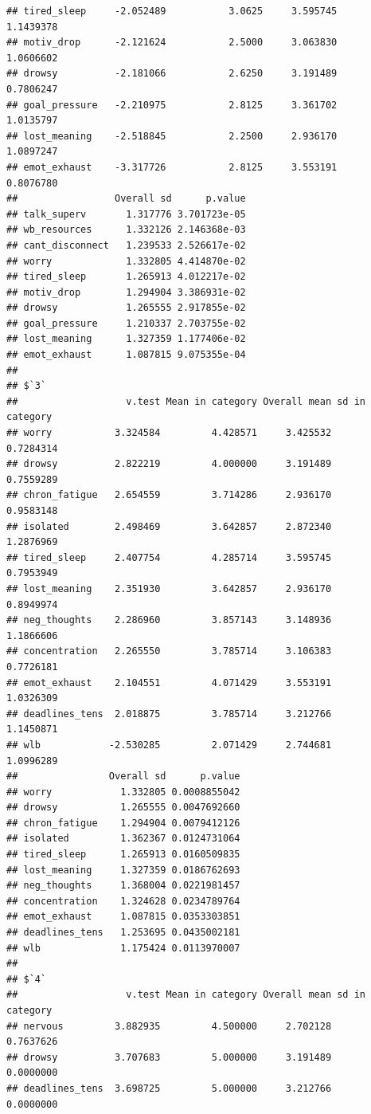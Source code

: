\documentclass[
]{article}
\begin{document}
\begin{verbatim}
## tired_sleep     -2.052489           3.0625     3.595745      1.1439378
## motiv_drop      -2.121624           2.5000     3.063830      1.0606602
## drowsy          -2.181066           2.6250     3.191489      0.7806247
## goal_pressure   -2.210975           2.8125     3.361702      1.0135797
## lost_meaning    -2.518845           2.2500     2.936170      1.0897247
## emot_exhaust    -3.317726           2.8125     3.553191      0.8076780
##                 Overall sd      p.value
## talk_superv       1.317776 3.701723e-05
## wb_resources      1.332126 2.146368e-03
## cant_disconnect   1.239533 2.526617e-02
## worry             1.332805 4.414870e-02
## tired_sleep       1.265913 4.012217e-02
## motiv_drop        1.294904 3.386931e-02
## drowsy            1.265555 2.917855e-02
## goal_pressure     1.210337 2.703755e-02
## lost_meaning      1.327359 1.177406e-02
## emot_exhaust      1.087815 9.075355e-04
## 
## $`3`
##                   v.test Mean in category Overall mean sd in category
## worry           3.324584         4.428571     3.425532      0.7284314
## drowsy          2.822219         4.000000     3.191489      0.7559289
## chron_fatigue   2.654559         3.714286     2.936170      0.9583148
## isolated        2.498469         3.642857     2.872340      1.2876969
## tired_sleep     2.407754         4.285714     3.595745      0.7953949
## lost_meaning    2.351930         3.642857     2.936170      0.8949974
## neg_thoughts    2.286960         3.857143     3.148936      1.1866606
## concentration   2.265550         3.785714     3.106383      0.7726181
## emot_exhaust    2.104551         4.071429     3.553191      1.0326309
## deadlines_tens  2.018875         3.785714     3.212766      1.1450871
## wlb            -2.530285         2.071429     2.744681      1.0996289
##                Overall sd      p.value
## worry            1.332805 0.0008855042
## drowsy           1.265555 0.0047692660
## chron_fatigue    1.294904 0.0079412126
## isolated         1.362367 0.0124731064
## tired_sleep      1.265913 0.0160509835
## lost_meaning     1.327359 0.0186762693
## neg_thoughts     1.368004 0.0221981457
## concentration    1.324628 0.0234789764
## emot_exhaust     1.087815 0.0353303851
## deadlines_tens   1.253695 0.0435002181
## wlb              1.175424 0.0113970007
## 
## $`4`
##                   v.test Mean in category Overall mean sd in category
## nervous         3.882935         4.500000     2.702128      0.7637626
## drowsy          3.707683         5.000000     3.191489      0.0000000
## deadlines_tens  3.698725         5.000000     3.212766      0.0000000

\end{verbatim}
\end{document}
